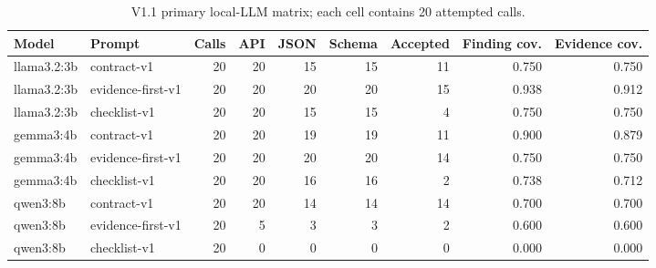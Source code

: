 \begin{table}[htbp]
\centering
\caption{V1.1 primary local-LLM matrix; each cell contains 20 attempted calls.}
\label{tab:llm-primary-matrix}
\small
\begin{adjustbox}{max width=\textwidth}
\begin{tabular}{llrrrrrrr}
\toprule
Model & Prompt & Calls & API & JSON & Schema & Accepted & Finding cov. & Evidence cov. \\
\midrule
llama3.2:3b & contract-v1 & 20 & 20 & 15 & 15 & 11 & 0.750 & 0.750 \\
llama3.2:3b & evidence-first-v1 & 20 & 20 & 20 & 20 & 15 & 0.938 & 0.912 \\
llama3.2:3b & checklist-v1 & 20 & 20 & 15 & 15 & 4 & 0.750 & 0.750 \\
gemma3:4b & contract-v1 & 20 & 20 & 19 & 19 & 11 & 0.900 & 0.879 \\
gemma3:4b & evidence-first-v1 & 20 & 20 & 20 & 20 & 14 & 0.750 & 0.750 \\
gemma3:4b & checklist-v1 & 20 & 20 & 16 & 16 & 2 & 0.738 & 0.712 \\
qwen3:8b & contract-v1 & 20 & 20 & 14 & 14 & 14 & 0.700 & 0.700 \\
qwen3:8b & evidence-first-v1 & 20 & 5 & 3 & 3 & 2 & 0.600 & 0.600 \\
qwen3:8b & checklist-v1 & 20 & 0 & 0 & 0 & 0 & 0.000 & 0.000 \\
\bottomrule
\end{tabular}
\end{adjustbox}
\par{}
\par{}
\end{table}
